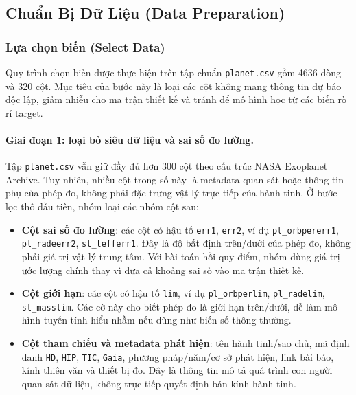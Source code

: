﻿\subsection{Chuẩn Bị Dữ Liệu (Data Preparation)}


\subsubsection{Lựa chọn biến (Select Data)}

Quy trình chọn biến được thực hiện trên tập chuẩn \texttt{planet.csv} gồm 4636 dòng và 320
cột. Mục tiêu của bước này là loại các cột không mang thông tin dự báo độc lập, giảm nhiễu cho ma
trận thiết kế và tránh để mô hình học từ các biến rò rỉ target.

\paragraph{Giai đoạn 1: loại bỏ siêu dữ liệu và sai số đo lường.}
Tập \texttt{planet.csv} vẫn giữ đầy đủ hơn 300 cột theo cấu trúc NASA Exoplanet Archive.
Tuy nhiên, nhiều cột trong số này là metadata quan sát hoặc thông tin phụ của phép đo, không phải
đặc trưng vật lý trực tiếp của hành tinh. Ở bước lọc thô đầu tiên, nhóm loại các nhóm cột sau:
\begin{itemize}
    \item \textbf{Cột sai số đo lường}: các cột có hậu tố \texttt{err1}, \texttt{err2}, ví dụ
          \texttt{pl\_orbpererr1}, \texttt{pl\_radeerr2}, \texttt{st\_tefferr1}. Đây là độ bất
          định trên/dưới của phép đo, không phải giá trị vật lý trung tâm. Với bài toán hồi quy
          điểm, nhóm dùng giá trị ước lượng chính thay vì đưa cả khoảng sai số vào ma trận thiết kế.
    \item \textbf{Cột giới hạn}: các cột có hậu tố \texttt{lim}, ví dụ \texttt{pl\_orbperlim},
          \texttt{pl\_radelim}, \texttt{st\_masslim}. Các cờ này cho biết phép đo là giới hạn
          trên/dưới, dễ làm mô hình tuyến tính hiểu nhầm nếu dùng như biến số thông thường.
    \item \textbf{Cột tham chiếu và metadata phát hiện}: tên hành tinh/sao chủ, mã định danh
          \texttt{HD}, \texttt{HIP}, \texttt{TIC}, \texttt{Gaia}, phương pháp/năm/cơ sở phát hiện,
          link bài báo, kính thiên văn và thiết bị đo. Đây là thông tin mô tả quá trình con người
          quan sát dữ liệu, không trực tiếp quyết định bán kính hành tinh.
\end{itemize}

